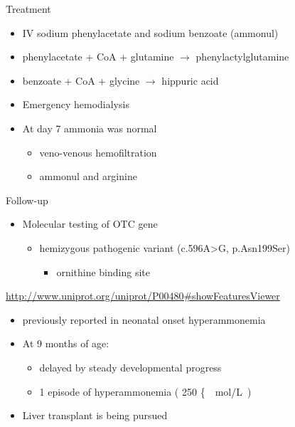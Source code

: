 \documentclass[presentation, smaller]{beamer}
\begin{document}
\begin{frame}[label={sec:orgheadline16}]{Treatment}
\begin{itemize}
\item IV sodium phenylacetate and sodium benzoate (ammonul)
\end{itemize}
\begin{block}{}
\begin{itemize}
\item phenylacetate + CoA + glutamine \(\to\) phenylactylglutamine
\item benzoate + CoA + glycine \(\to\) hippuric acid
\end{itemize}
\end{block}
\begin{itemize}
\item Emergency hemodialysis
\end{itemize}
\begin{itemize}
\item At day 7 ammonia was normal
\begin{itemize}
\item veno-venous hemofiltration
\item ammonul and arginine
\end{itemize}
\end{itemize}
\end{frame}

\begin{frame}[label={sec:orgheadline17}]{Follow-up}
\begin{itemize}
\item Molecular testing of OTC gene
\begin{itemize}
\item hemizygous pathogenic variant (c.596A>G, p.Asn199Ser)
\begin{itemize}
\item ornithine binding site
\end{itemize}
\end{itemize}
\end{itemize}
\url{http://www.uniprot.org/uniprot/P00480#showFeaturesViewer}
\begin{itemize}
\item previously reported in neonatal onset hyperammonemia
\end{itemize}
\begin{itemize}
\item At 9 months of age:
\begin{itemize}
\item delayed by steady developmental progress
\item 1 episode of hyperammonemia ( 250 \si\{\textmu{}\mol/L)
\end{itemize}
\item Liver transplant is being pursued
\end{itemize}
\end{frame}
\end{document}
